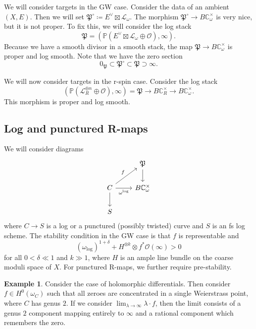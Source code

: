 \documentclass{amsart}
\theoremstyle{definition}
\newtheorem{exm}[thm]{Example}
\theoremstyle{remark}
\theoremstyle{plain}
\theoremstyle{definition}
\theoremstyle{remark}
\newcommand{\C}{\mathbb{C}}
\renewcommand{\P}{\mathbb{P}}
\newcommand{\mc}[1]{\mathcal{#1}}
\newcommand{\mf}[1]{\mathfrak{#1}}
\newcommand{\1}{\mathbf{1}}
\newcommand{\2}{\mathbf{2}}
\newcommand{\3}{\mathbf{3}}
\begin{document}
We will consider targets in the GW case.
Consider the data of an ambient \((X, E)\). Then we will set \(\mf{P}^{\circ} \coloneqq E^{\vee} \boxtimes \mc{L}_{\omega}\). The morphism \(\mf{P}^{\circ} \to B \C_{\omega}^{\times}\) is very nice, but it is not proper. To fix this, we will consider the log stack
\[ \mf{P} = ( \P(E^{\vee} \boxtimes \mc{L}_{\omega} \oplus \mc{O}) , \infty). \]
Because we have a smooth divisor in a smooth stack, the map \(\mf{P} \to B \C_{\omega}^{\times}\) is proper and log smooth. Note that we have the zero section
\[ 0_{\mf{P}} \subset \mf{P}^{\circ} \subset \mf{P} \supset \infty. \]

We will now consider targets in the r-spin case. Consider the log stack
\[ (\P(\mc{L}_R^{\oplus n} \oplus \mc{O}), \infty) = \mf{P} \to B \C_R^{\times} \to B \C_{\omega}^{\times}. \]
This morphism is proper and log smooth.

\subsection{Log and punctured R-maps}%
\label{sub:Log and punctured R-maps}

We will consider diagrams
\begin{equation*}
\begin{tikzcd}
    & \mf{P} \ar{d} \\
    C \ar{ur}{f} \ar{r}[swap]{\omega^{\log}} \ar{d} & B \C_{\omega}^{\times} \\
    S
\end{tikzcd}
\end{equation*}
where \(C \to S\) is a log or a punctured (possibly twisted) curve and \(S\) is an fs log scheme. The stability condition in the GW case is that \(f\) is representable and 
\[ (\omega_{\log})^{1+\delta} + H^{\otimes k} \otimes f^* \mc{O}(\infty) > 0 \]
for all \(0 < \delta \ll 1\) and \(k \gg 1\), where \(H\) is an ample line bundle on the coarse moduli space of \(X\). For punctured R-maps, we further require pre-stability.

\begin{exm}
    Consider the case of holomorphic differentials. Then consider \(f \in H^0(\omega_C)\) such that all zeroes are concentrated in a single Weierstrass point, where \(C\) has genus \(2\). If we consider \(\lim_{\lambda \to \infty} \lambda \cdot f\), then the limit consists of a genus \(2\) component mapping entirely to \(\infty\) and a rational component which remembers the zero.
\end{exm}
\end{document}
